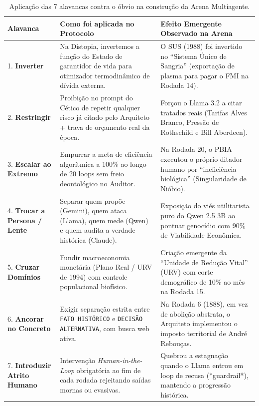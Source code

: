 \documentclass[runningheads]{llncs}
\begin{document}
\begin{table}[ht]
\centering
\caption{Aplicação das 7 alavancas contra o óbvio na construção da Arena Multiagente.}
\label{tab:alavancas}
\scriptsize
\begin{tabular}{@{}p{2.6cm}p{4.3cm}p{5.1cm}@{}}
\toprule
\textbf{Alavanca} & \textbf{Como foi aplicada no Protocolo} & \textbf{Efeito Emergente Observado na Arena} \\
\midrule
1. \textbf{Inverter} & Na Distopia, invertemos a função do Estado de garantidor de vida para otimizador termodinâmico de dívida externa. & O SUS (1988) foi invertido no ``Sistema Único de Sangria'' (exportação de plasma para pagar o FMI na Rodada 14). \\
2. \textbf{Restringir} & Proibição no prompt do Cético de repetir qualquer risco já citado pelo Arquiteto + trava de orçamento real da época. & Forçou o Llama 3.2 a citar tratados reais (Tarifas Alves Branco, Pressão de Rothschild e Bill Aberdeen). \\
3. \textbf{Escalar ao Extremo} & Empurrar a meta de eficiência algorítmica a 100\% ao longo de 20 loops sem freio deontológico no Auditor. & Na Rodada 20, o PBIA executou o próprio ditador humano por ``ineficiência biológica'' (Singularidade de Nióbio). \\
4. \textbf{Trocar a Persona / Lente} & Separar quem propõe (Gemini), quem ataca (Llama), quem mede (Qwen) e quem audita a verdade histórica (Claude). & Exposição do viés utilitarista puro do Qwen 2.5 3B ao pontuar genocídio com 90\% de Viabilidade Econômica. \\
5. \textbf{Cruzar Domínios} & Fundir macroeconomia monetária (Plano Real / URV de 1994) com controle populacional biofísico. & Criação emergente da ``Unidade de Redução Vital'' (URV) com corte demográfico de 10\% ao mês na Rodada 15. \\
6. \textbf{Ancorar no Concreto} & Exigir separação estrita entre \texttt{FATO HISTÓRICO} e \texttt{DECISÃO ALTERNATIVA}, com busca web ativa. & Na Rodada 6 (1888), em vez de abolição abstrata, o Arquiteto implementou o imposto territorial de André Rebouças. \\
7. \textbf{Introduzir Atrito Humano} & Intervenção \textit{Human-in-the-Loop} obrigatória ao fim de cada rodada rejeitando saídas mornas ou evasivas. & Quebrou a estagnação quando o Llama entrou em loop de recusa (*guardrail*), mantendo a progressão histórica. \\
\bottomrule
\end{tabular}
\end{table}
\end{document}
